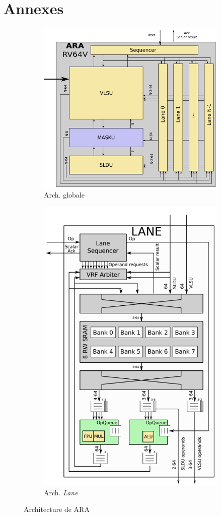 \documentclass[11pt,letterpaper]{article}
\begin{document}
\section*{Annexes}
    \begin{figure}[H]
        \begin{subfigure}{.5\textwidth}
        \centering
        \includegraphics[width=1.1\linewidth]{ara_arch.png}
        \caption{Arch. globale}
        \label{fig:top_arch}
        \end{subfigure}%
        \begin{subfigure}{.5\textwidth}
        \centering
        \includegraphics[width=.65\linewidth]{lane_arch.png}
        \caption{Arch. \textit{Lane}}
        \label{fig:lane_arch}
        \end{subfigure}
        \caption{Architecture de ARA}
        \label{fig:ara_arch}
    \end{figure}
\end{document}
